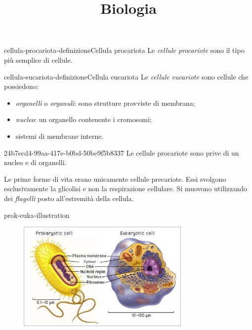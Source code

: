 \documentclass[preview]{standalone}
\begin{document}
\title{Biologia}
\genpage

\begin{snippetdefinition}{cellula-procariota-definizione}{Cellula procariota}
    Le \textit{cellule procariote} sono il tipo più semplice di cellule.
\end{snippetdefinition}

\begin{snippetdefinition}{cellula-eucariota-definizione}{Cellula eucariota}
    Le \textit{cellule eucariote} sono cellule
    che possiedono:
    \begin{itemize}
        \item \textit{organelli} o \textit{organuli}: sono strutture provviste di membrana;
        \item \textit{nucleo}: un organello contenente i cromosomi;
        \item sistemi di membrane interne.
    \end{itemize}
\end{snippetdefinition}

\begin{snippet}{24b7ecd4-99aa-417e-b0bd-50be9f5b8337}
    Le cellule procariote sono prive di un nucleo e di organelli.

    Le prime forme di vita erano unicamente cellule precariote.
    Essi svolgono esclusivamente la glicolisi e non la respirazione cellulare.
    Si muovono utilizzando dei \textit{flagelli} posto all'estremità della cellula.
\end{snippet}

\begin{snippet}{prok-euka-illustration}
    \begin{center}
    \begin{figure}[th]
        \centering
        \includegraphics[width=0.75\textwidth]{./resources/prok-euka.png}
    \end{figure}
    \end{center}
\end{snippet}
\end{document}
